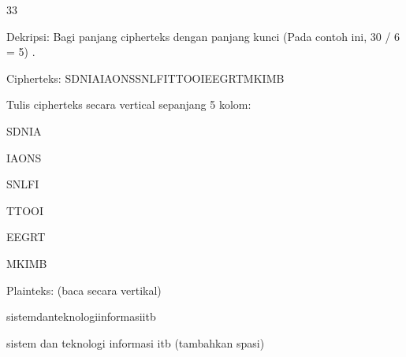 \documentclass{article}
\begin{document}

33

Dekripsi: Bagi panjang cipherteks dengan panjang kunci  (Pada contoh ini, 30 / 6 = 5) .

                Cipherteks: SDNIAIAONSSNLFITTOOIEEGRTMKIMB


Tulis cipherteks secara vertical sepanjang 5 kolom:        




SDNIA



IAONS



SNLFI



TTOOI



EEGRT



MKIMB

Plainteks: (baca secara vertikal)

sistemdanteknologiinformasiitb

sistem dan teknologi informasi itb         (tambahkan spasi)
\end{document}
